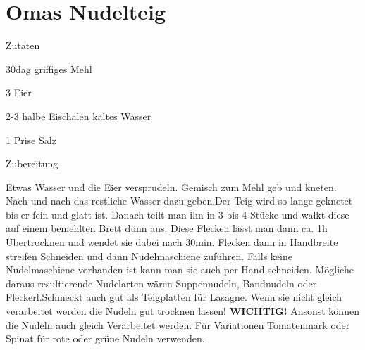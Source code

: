 \chapter*{Omas Nudelteig}
\begin{multicols}{2}
 {\Large Zutaten}
 \begin{Zutaten}
		\item 30dag griffiges Mehl
		\item 3 Eier
		\item 2-3 halbe Eischalen kaltes Wasser
		\item 1 Prise Salz
		
		
\end{Zutaten}
\columnbreak
{}
\end{multicols}

{\Large Zubereitung} \newline
\begin{addmargin}[1cm]{0cm}
	Etwas Wasser und die Eier versprudeln. Gemisch zum Mehl geb und kneten. Nach und nach das restliche
	Wasser dazu geben.\newline Der Teig wird so lange geknetet bis er fein und glatt ist.\newline
	Danach teilt man ihn in 3 bis 4 Stücke und walkt diese auf einem bemehlten Brett dünn aus.\newline
	Diese Flecken lässt man dann ca. 1h Übertrocknen und wendet sie dabei nach 30min.\newline
	Flecken dann in Handbreite streifen Schneiden und dann Nudelmaschiene zuführen. Falls keine
	Nudelmaschiene vorhanden ist kann man sie auch per Hand schneiden.\newline
	Mögliche daraus resultierende Nudelarten wären Suppennudeln, Bandnudeln oder Fleckerl.\newline Schmeckt auch
	gut als Teigplatten für Lasagne.\newline\newline
	Wenn sie nicht gleich verarbeitet werden die Nudeln gut trocknen lassen! \textbf{WICHTIG!}
	Ansonst können die Nudeln auch gleich Verarbeitet werden.
	\newline\newline
	Für Variationen Tomatenmark oder Spinat für rote oder grüne Nudeln verwenden.
	

\end{addmargin}

